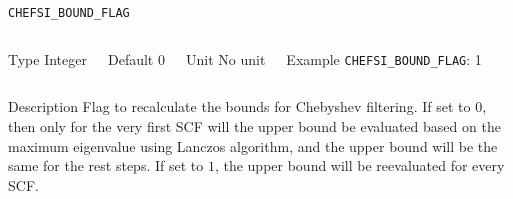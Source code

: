 \begin{frame}[allowframebreaks]{\texttt{CHEFSI\_BOUND\_FLAG}} \label{CHEFSI_BOUND_FLAG}
\vspace*{-12pt}
\begin{columns}
\begin{block}{Type}
Integer
\end{block}

\begin{block}{Default}
0
\end{block}

\begin{block}{Unit}
No unit
\end{block}

\begin{block}{Example}
\texttt{CHEFSI\_BOUND\_FLAG}: 1
\end{block}
\end{columns}

\begin{block}{Description}
Flag to recalculate the bounds for Chebyshev filtering. If set to $0$, then only for the very first SCF will the upper bound be evaluated based on the maximum eigenvalue using Lanczos algorithm, and the upper bound will be the same for the rest steps. If set to $1$, the upper bound will be reevaluated for every SCF.
\end{block}

\end{frame}



